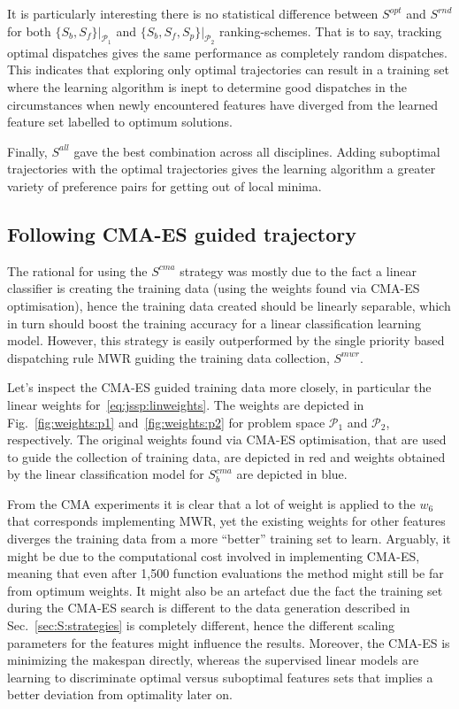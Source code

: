 \documentclass[smallextended]{llncs}
\begin{document}
It is particularly interesting there is no statistical difference between $S^{opt}$ and $S^{rnd}$ for both 
$\{S_{b},S_{f}\}\big|_{\mathcal{P}_1}$ and $\{S_b,S_f,S_p\}\big|_{\mathcal{P}_2}$ ranking-schemes. That is to say, 
tracking optimal dispatches gives the same performance as completely random dispatches. This indicates that exploring 
only optimal trajectories can result in a training set where the learning algorithm is inept to determine good 
dispatches in the circumstances when newly encountered features have diverged from the learned feature set labelled to 
optimum solutions. 

Finally, $S^{all}$ gave the best combination across all disciplines. Adding suboptimal trajectories with the optimal trajectories gives the learning algorithm a greater variety of preference pairs for getting out of local minima.

\subsection{Following CMA-ES guided trajectory}
The rational for using the $S^{cma}$ strategy was mostly due to the fact a linear classifier is creating the training data (using the weights found via CMA-ES optimisation), hence the training data created should be linearly separable, which in turn should boost the training accuracy for a linear classification learning model. However, this strategy is easily outperformed by the single priority based dispatching rule MWR guiding the training data collection, $S^{mwr}$. 

Let's inspect the CMA-ES guided training data more closely, in particular the linear weights for~\eqref{eq:jssp:linweights}. The weights are depicted in Fig.~\ref{fig:weights:p1} and~\ref{fig:weights:p2} for problem space $\mathcal{P}_1$ and $\mathcal{P}_2$, respectively. The original weights found via CMA-ES optimisation, that are used to guide the collection of training data, are depicted in red and  weights obtained by the linear classification model for $S_b^{cma}$ are depicted in blue.

From the CMA experiments it is clear that a lot of weight is applied to the $w_6$ that corresponds implementing MWR, yet the existing weights for other features diverges the training data from a more ``better'' training set to learn. Arguably, it might be due to the computational cost involved in implementing CMA-ES, meaning that even after 1,500 function evaluations the method might still be far from optimum weights. It might also be an artefact due the fact the training set during the CMA-ES search is different to the data generation described in Sec.~\ref{sec:S:strategies} is completely different, hence the different scaling parameters for the features might influence the results. Moreover, the CMA-ES is minimizing the makespan directly, whereas the supervised linear models are learning to discriminate optimal versus suboptimal features sets that implies a better deviation from optimality later on. 
\end{document}
